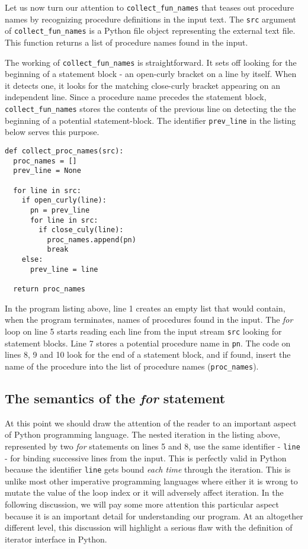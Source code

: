 \documentclass[10pt, a4paper]{article}
\begin{document}
Let us now turn our attention to \texttt{collect\_fun\_names} that teases out procedure names by recognizing procedure definitions in the input text. The \texttt{src} argument of \texttt{collect\_fun\_names} is a Python file object representing the external text file. This function returns a list of procedure names found in the input. 

The working of \texttt{collect\_fun\_names} is straightforward. It sets off looking for the beginning of a statement block - an open-curly bracket on a line by itself. When it detects one, it looks for the matching close-curly bracket appearing on an independent line. Since a procedure name precedes the statement block, \texttt{collect\_fun\_names} stores the contents of the previous line on detecting the the beginning of a potential statement-block. The identifier \texttt{prev\_line} in the listing below serves this purpose. 

\noindent\begin{lstlisting}
def collect_proc_names(src):
  proc_names = []
  prev_line = None

  for line in src:
    if open_curly(line):
      pn = prev_line
      for line in src:
        if close_culy(line):
          proc_names.append(pn)
          break
    else:
      prev_line = line

  return proc_names
\end{lstlisting}

In the program listing above, line 1 creates an empty list that would contain, when the program terminates, names of procedures found in the input. The \textit{for} loop on line 5 starts reading each line from the input stream \texttt{src} looking for statement blocks. Line 7 stores a potential procedure name in \texttt{pn}. The code on lines 8, 9 and 10 look for the end of a statement block, and if found, insert the name of the procedure into the list of procedure names (\texttt{proc\_names}).

\subsection{The semantics of the \textit{for} statement}
At this point we should draw the attention of the reader to an important aspect of Python programming language. The nested iteration in the listing above, represented by two \textit{for} statements on lines 5 and 8, use the same identifier - \texttt{line} - for binding successive lines from the input. This is perfectly valid in Python because the identifier \texttt{line} gets bound \textit{each time} through the iteration. This is unlike most other imperative programming languages where either it is wrong to mutate the value of the loop index or it will adversely affect iteration. In the following discussion, we will pay some more attention this particular aspect because it is an important detail for understanding our program. At an altogether different level, this discussion will highlight a serious flaw with the definition of iterator interface in Python.
\end{document}
